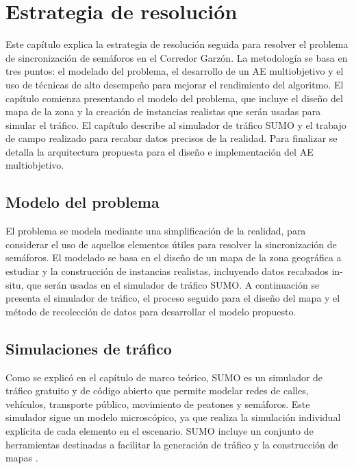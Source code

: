 \chapter{Estrategia de resolución}

Este capítulo explica la estrategia de resolución seguida para resolver el problema de sincronización de semáforos en el Corredor Garzón. La metodología se basa en tres puntos: el modelado del problema, el desarrollo de un AE multiobjetivo y el uso de técnicas de alto desempeño para mejorar el rendimiento del algoritmo. El capítulo comienza presentando el modelo del problema, que incluye el diseño del mapa de la zona y la creación de instancias realistas que serán usadas para simular el tráfico. El capítulo describe al simulador de tráfico SUMO y el trabajo de campo realizado para recabar datos precisos de la realidad. Para finalizar se detalla la arquitectura propuesta para el diseño e implementación del AE multiobjetivo.



\section{Modelo del problema }

El problema se modela mediante una simplificación de la realidad, para considerar el uso de aquellos elementos útiles para resolver la sincronización de semáforos. El modelado se basa en el diseño de un mapa de la zona geográfica a estudiar y la construcción de instancias realistas, incluyendo datos recabados in-situ, que serán usadas en el simulador de tráfico SUMO. A continuación se presenta el simulador de tráfico, el proceso seguido para el diseño del mapa y el método de recolección de datos para desarrollar el modelo propuesto. 

\section{Simulaciones de tráfico}

Como se explicó en el capítulo de marco teórico, SUMO es un simulador de tráfico gratuito y de código abierto que permite modelar redes de calles, vehículos, transporte público, movimiento de peatones y semáforos. Este simulador sigue un modelo microscópico, ya que realiza la simulación individual explícita de cada elemento en el escenario. SUMO incluye un conjunto de herramientas destinadas a facilitar la generación de tráfico y la construcción de mapas \citep{SumoTools}. 

